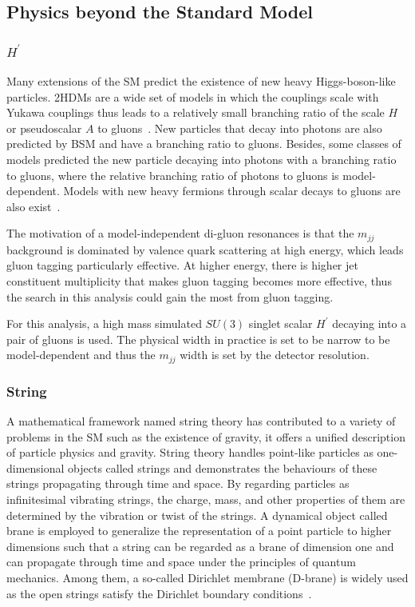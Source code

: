 \documentclass[UTF8,12pt]{ctexart}
\numberwithin{equation}{section}
\def\mjj{$m_{jj}$ }
\begin{document}
\subsection{Physics beyond the Standard Model}
\label{sec:2.2}
\subsubsection{$H^\prime$}

Many extensions of the SM predict the existence of new heavy Higgs-boson-like particles. 2HDMs are a wide set of models in which the couplings scale with Yukawa couplings thus leads to a relatively small branching ratio of the scale $H$ or pseudoscalar $A$ to gluons~\cite{Harlander:2013qxa}. New particles that decay into photons are also predicted by BSM and have a branching ratio to gluons.  Besides, some classes of models predicted the new particle decaying into photons with a branching ratio to gluons, where the relative branching ratio of photons to gluons is model-dependent. Models with new heavy fermions through scalar decays to gluons are also exist~\cite{PhysRevLett.116.150001,Agashe:2020wph,Curtin:2013fra}.

The motivation of a model-independent di-gluon resonances is that the \mjj background is dominated by valence quark scattering at high energy, which leads gluon tagging particularly effective. At higher energy, there is higher jet constituent multiplicity that makes gluon tagging becomes more effective, thus the search in this analysis could gain the most from gluon tagging.

For this analysis, a high mass simulated $SU(3)$ singlet scalar $H^\prime$ decaying into a pair of gluons is used. The physical width in practice is set to be narrow to be model-dependent and thus the \mjj width is set by the detector resolution.

\subsubsection{String}


A mathematical framework named string theory has contributed to a variety of problems in the SM such as the existence of gravity, it offers a unified description of particle physics and gravity. String theory handles point-like particles as one-dimensional objects called strings and demonstrates the behaviours of these strings propagating through time and space. By regarding particles as infinitesimal vibrating strings, the charge, mass, and other properties of them are determined by the vibration or twist of the strings. A dynamical object called brane is employed to generalize the representation of a point particle to higher dimensions such that a string can be regarded as a brane of dimension one and can propagate through time and space under the principles of quantum mechanics. Among them, a so-called Dirichlet membrane (D-brane) is widely used as the open strings satisfy the Dirichlet boundary conditions~\cite{Antoniadis:2000ena,Cremades:2002qm,Antoniadis:2002qm}.
\end{document}
